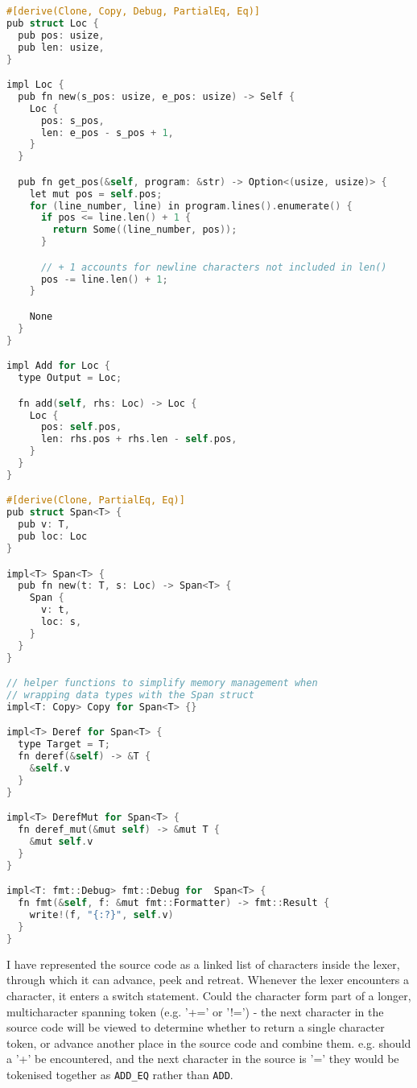 \begin{lstlisting}[language=C]
#[derive(Clone, Copy, Debug, PartialEq, Eq)]
pub struct Loc {
  pub pos: usize,
  pub len: usize,
}

impl Loc {
  pub fn new(s_pos: usize, e_pos: usize) -> Self {
    Loc {
      pos: s_pos,
      len: e_pos - s_pos + 1,
    }
  }

  pub fn get_pos(&self, program: &str) -> Option<(usize, usize)> {
    let mut pos = self.pos;
    for (line_number, line) in program.lines().enumerate() {
      if pos <= line.len() + 1 {
        return Some((line_number, pos));
      }

      // + 1 accounts for newline characters not included in len()
      pos -= line.len() + 1;
    }

    None
  }
}

impl Add for Loc {
  type Output = Loc;

  fn add(self, rhs: Loc) -> Loc {
    Loc {
      pos: self.pos,
      len: rhs.pos + rhs.len - self.pos,
    }
  }
}

#[derive(Clone, PartialEq, Eq)]
pub struct Span<T> {
  pub v: T,
  pub loc: Loc
}

impl<T> Span<T> {
  pub fn new(t: T, s: Loc) -> Span<T> {
    Span {
      v: t,
      loc: s,
    }
  }
}

// helper functions to simplify memory management when 
// wrapping data types with the Span struct
impl<T: Copy> Copy for Span<T> {}

impl<T> Deref for Span<T> {
  type Target = T;
  fn deref(&self) -> &T {
    &self.v
  }
}

impl<T> DerefMut for Span<T> {
  fn deref_mut(&mut self) -> &mut T {
    &mut self.v
  }
}

impl<T: fmt::Debug> fmt::Debug for  Span<T> {
  fn fmt(&self, f: &mut fmt::Formatter) -> fmt::Result {
    write!(f, "{:?}", self.v)
  }
}
\end{lstlisting}

I have represented the source code as a linked list of characters inside the lexer, through which it can advance, peek and retreat. Whenever the lexer encounters a character, it enters a switch statement. Could the character form part of a longer, multicharacter spanning token (e.g. '+=' or '!=') - the next character in the source code will be viewed to determine whether to return a single character token, or advance another place in the source code and combine them. e.g. should a '+' be encountered, and the next character in the source is '=' they would be tokenised together as \texttt{ADD\_EQ} rather than \texttt{ADD}.

